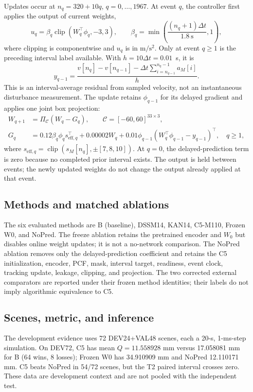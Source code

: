 \documentclass[11pt]{article}
\newcommand{\clip}{\operatorname{clip}}
\newcommand{\Cset}{\mathcal{C}}
\begin{document}
Updates occur at $n_q=320+10q$, $q=0,\ldots,1967$. At event $q$, the controller first applies the output of current weights,
\begin{equation}
  u_q=\beta_q\clip(W_q^\top\phi_q,-3,3),
  \qquad \beta_q=\min\!\left(\frac{(n_q+1)\Delta t}{1.8~\mathrm{s}},1\right),
\end{equation}
where clipping is componentwise and $u_q$ is in $\mathrm{m}/\mathrm{s}^2$. Only at event $q\geq1$ is the preceding interval label available. With $h=10\Delta t=0.01$~s, it is
\begin{equation}
  y_{q-1}=\frac{v[n_q]-v[n_{q-1}]
          -\Delta t\displaystyle\sum_{i=n_{q-1}}^{n_q-1}a_M[i]}{h}.
  \label{eq:interval-target}
\end{equation}
This is an interval-average residual from sampled velocity, not an instantaneous disturbance measurement. The update retains $\phi_{q-1}$ for its delayed gradient and applies one joint box projection:
\begin{align}
  W_{q+1}&=\Pi_{\Cset}(W_q-G_q), \qquad
  \Cset=[-60,60]^{33\times3}, \\
  G_q&=0.12\beta_q\phi_q s_{\mathrm{eff},q}^{\top}
       +0.00002W_q
       +0.01\phi_{q-1}(W_q^{\top}\phi_{q-1}-y_{q-1})^{\top}, \quad q\geq1,
  \label{eq:update}
\end{align}
where $s_{\mathrm{eff},q}=\clip(s_M[n_q],\pm[7,8,10])$. At $q=0$, the delayed-prediction term is zero because no completed prior interval exists. The output is held between events; the newly updated weights do not change the output already applied at that event.

\subsection{Methods and matched ablations}
The six evaluated methods are B (baseline), DSSM14, KAN14, C5-M110, Frozen W0, and NoPred. The freeze ablation retains the pretrained encoder and $W_0$ but disables online weight updates; it is not a no-network comparison. The NoPred ablation removes only the delayed-prediction coefficient and retains the C5 initialization, encoder, PCF, mask, interval target, readiness, event clock, tracking update, leakage, clipping, and projection. The two corrected external comparators are reported under their frozen method identities; their labels do not imply algorithmic equivalence to C5.

\subsection{Scenes, metric, and inference}
The development evidence uses 72 DEV24+VAL48 scenes, each a 20-s, 1-ms-step simulation. On DEV72, C5 has mean $Q=11.558928$ mm versus 17.058081 mm for B (64 wins, 8 losses); Frozen W0 has 34.910909 mm and NoPred 12.110171 mm. C5 beats NoPred in 54/72 scenes, but the T2 paired interval crosses zero. These data are development context and are not pooled with the independent test.
\end{document}
